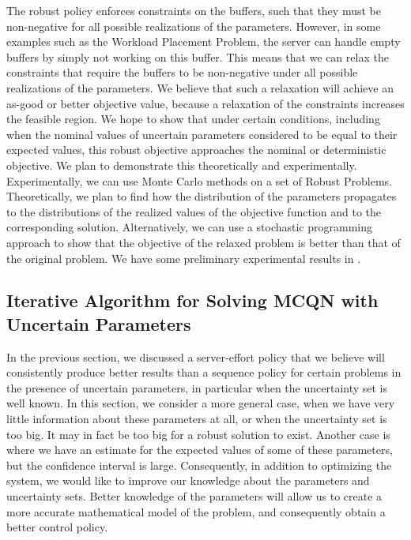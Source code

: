 \documentclass[11pt,a4paper,titlepage]{article}
\theoremstyle{definition}
\theoremstyle{plain}
\begin{document}
    The robust policy enforces constraints on the buffers,
    such that they must be non-negative for all possible realizations of the parameters.
    However,
    in some examples such as the Workload Placement Problem,
    the server can handle empty buffers by simply not working on this buffer.
    This means that we can relax the constraints that require the buffers to be non-negative under all possible realizations of the parameters.
    We believe that such a relaxation will achieve an as-good or better objective value,
    because a relaxation of the constraints increases the feasible region.
    We hope to show that under certain conditions,
    including when the nominal values of uncertain parameters considered to be equal to their expected values,
    this robust objective approaches the nominal or deterministic objective.
    We plan to demonstrate this theoretically and experimentally.
    Experimentally,
    we can use Monte Carlo methods on a set of Robust Problems.
    Theoretically,
    we plan to find how the distribution of the parameters propagates to the distributions of the realized values of the objective function and to the corresponding solution.
    Alternatively,
    we can use a stochastic programming approach to show that the objective of the relaxed problem is better than that of the original problem.
    We have some preliminary experimental results in .

    \subsection{Iterative Algorithm for Solving MCQN with Uncertain Parameters}
    \label{subsec:topics:iterative}


    In the previous section,
    we discussed a server-effort policy that we believe will consistently produce better results than a sequence policy for certain problems in the presence of uncertain parameters,
    in particular when the uncertainty set is well known.
    In this section,
    we consider a more general case,
    when we have very little information about these parameters at all,
    or when the uncertainty set is too big.
    It may in fact be too big for a robust solution to exist.
    Another case is where we have an estimate for the expected values of some of these parameters,
    but the confidence interval is large.
    Consequently,
    in addition to optimizing the system,
    we would like to improve our knowledge about the parameters and uncertainty sets.
    Better knowledge of the parameters will allow us to create a more accurate mathematical model of the problem,
    and consequently obtain a better control policy.
\end{document}
